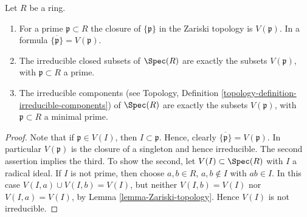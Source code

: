 \begin{lemma}
\label{lemma-irreducible}
Let $R$ be a ring.
\begin{enumerate}
\item For a prime $\mathfrak p \subset R$ the closure
of $\{\mathfrak p\}$ in the Zariski topology is $V(\mathfrak p)$.
In a formula $\overline{\{\mathfrak p\}} = V(\mathfrak p)$.
\item The irreducible closed subsets of $\Spec(R)$ are
exactly the subsets $V(\mathfrak p)$, with $\mathfrak p \subset R$
a prime.
\item The irreducible components (see Topology,
Definition \ref{topology-definition-irreducible-components})
of $\Spec(R)$ are  exactly the subsets $V(\mathfrak p)$,
with $\mathfrak p \subset R$ a minimal prime.
\end{enumerate}
\end{lemma}

\begin{proof}
Note that if $ \mathfrak p \in V(I)$, then
$I \subset \mathfrak p$. Hence,
clearly $\overline{\{\mathfrak p\}} = V(\mathfrak p)$.
In particular $V(\mathfrak p)$ is the closure of
a singleton and hence irreducible.
The second assertion implies the third.
To show the second, let
$V(I) \subset \Spec(R)$ with $I$ a radical ideal.
If $I$ is not prime, then choose $a, b\in R$, $a, b\not \in I$
with $ab\in I$. In this case $V(I, a) \cup V(I, b) = V(I)$,
but neither $V(I, b) = V(I)$ nor $V(I, a) = V(I)$, by
Lemma \ref{lemma-Zariski-topology}. Hence $V(I)$ is not
irreducible.
\end{proof}